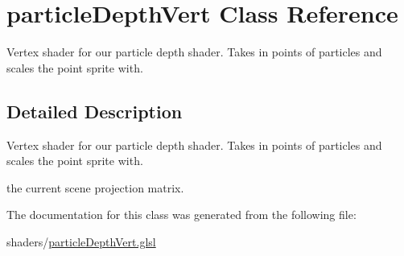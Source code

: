 \hypertarget{classparticle_depth_vert}{\section{particle\-Depth\-Vert Class Reference}
\label{classparticle_depth_vert}
}


Vertex shader for our particle depth shader. Takes in points of particles and scales the point sprite with.  




\subsection{Detailed Description}
Vertex shader for our particle depth shader. Takes in points of particles and scales the point sprite with. 

the current scene projection matrix. 

The documentation for this class was generated from the following file\-:\begin{DoxyCompactItemize}
\item 
shaders/\hyperlink{particle_depth_vert_8glsl}{particle\-Depth\-Vert.\-glsl}\end{DoxyCompactItemize}
